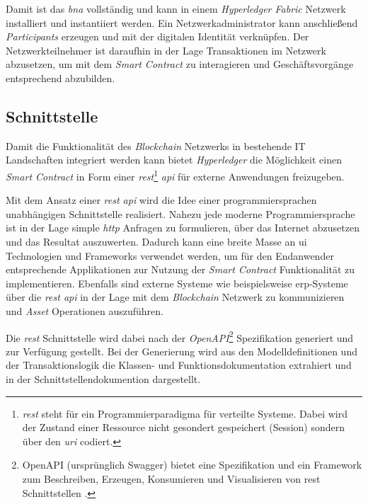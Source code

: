 \noindent
Damit ist das \textit{\acf{bna}} vollständig und kann in einem \textit{Hyperledger Fabric} Netzwerk installiert und instantiiert werden. Ein Netzwerkadministrator kann anschließend \textit{Participants} erzeugen und mit der digitalen Identität verknüpfen. Der Netzwerkteilnehmer ist daraufhin in der Lage Transaktionen im Netzwerk abzusetzen, um mit dem \textit{Smart Contract} zu interagieren und Geschäftsvorgänge entsprechend abzubilden.

\subsection{Schnittstelle}
Damit die Funktionalität des \textit{Blockchain} Netzwerks in bestehende IT Landschaften integriert werden kann bietet \textit{Hyperledger} die Möglichkeit einen \textit{Smart Contract} in Form einer \textit{\acs{rest}}\footnote{\textit{\acf{rest}} steht für ein Programmierparadigma für verteilte Systeme. Dabei wird der Zustand einer Ressource nicht gesondert gespeichert (Session) sondern über den \textit{\ac{uri}} codiert.} \textit{\acs{api}} für externe Anwendungen freizugeben.

Mit dem Ansatz einer \textit{\ac{rest} \ac{api}} wird die Idee einer programmiersprachen unabhängigen Schnittstelle realisiert. Nahezu jede moderne Programmiersprache ist in der Lage simple \textit{\ac{http}} Anfragen zu formulieren, über das Internet abzusetzen und das Resultat auszuwerten. Dadurch kann eine breite Masse an \ac{ui} Technologien und Frameworks verwendet werden, um für den Endanwender entsprechende Applikationen zur Nutzung der \textit{Smart Contract} Funktionalität zu implementieren. Ebenfalls sind externe Systeme wie beispielsweise \ac{erp}-Systeme über die \textit{\ac{rest} \ac{api}} in der Lage mit dem \textit{Blockchain} Netzwerk zu kommunizieren und \textit{Asset} Operationen auszuführen.

Die \textit{\ac{rest}} Schnittstelle wird dabei nach der \textit{OpenAPI}\footnote{OpenAPI (ursprünglich Swagger) bietet eine Spezifikation und ein Framework zum Beschreiben, Erzeugen, Konsumieren und Visualisieren von \ac{rest} Schnittstellen \citep{OAI2018, Purushothaman2015}.} Spezifikation generiert und zur Verfügung gestellt. Bei der Generierung wird aus den Modelldefinitionen und der Transaktionslogik die Klassen- und Funktionsdokumentation extrahiert und in der Schnittstellendokumention dargestellt.

